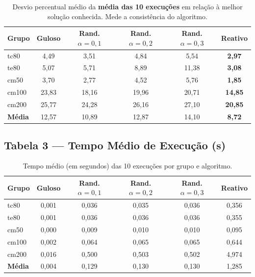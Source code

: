 \documentclass[12pt, a4paper]{article}
\begin{document}
{\small
\begin{table}[H]
\centering
\caption{Desvio percentual médio da \textbf{média das 10 execuções} em relação à melhor solução conhecida. Mede a consistência do algoritmo.}
\begin{tabular}{lccccc}
\toprule
\textbf{Grupo} & \textbf{Guloso} & \textbf{Rand. $\alpha{=}0{,}1$} & \textbf{Rand. $\alpha{=}0{,}2$} & \textbf{Rand. $\alpha{=}0{,}3$} & \textbf{Reativo} \\
\midrule
tc80  & 4,49 & 3,51 & 4,84 & 5,54 & \textbf{2,97} \\
te80  & 5,07 & 5,71 & 8,89 & 11,38 & \textbf{3,08} \\
cm50  & 3,70 & 2,77 & 4,52 & 5,76 & \textbf{1,85} \\
cm100 & 23,83 & 18,16 & 19,96 & 20,71 & \textbf{14,85} \\
cm200 & 25,77 & 24,28 & 26,16 & 27,10 & \textbf{20,85} \\
\midrule
\textbf{Média} & 12,57 & 10,89 & 12,87 & 14,10 & \textbf{8,72} \\
\bottomrule
\end{tabular}
\end{table}
}

\subsection{Tabela 3 --- Tempo Médio de Execução (s)}

{\small
\begin{table}[H]
\centering
\caption{Tempo médio (em segundos) das 10 execuções por grupo e algoritmo.}
\begin{tabular}{lccccc}
\toprule
\textbf{Grupo} & \textbf{Guloso} & \textbf{Rand. $\alpha{=}0{,}1$} & \textbf{Rand. $\alpha{=}0{,}2$} & \textbf{Rand. $\alpha{=}0{,}3$} & \textbf{Reativo} \\
\midrule
tc80  & 0,001 & 0,036 & 0,035 & 0,036 & 0,356 \\
te80  & 0,001 & 0,036 & 0,036 & 0,036 & 0,355 \\
cm50  & 0,000 & 0,009 & 0,010 & 0,010 & 0,095 \\
cm100 & 0,002 & 0,064 & 0,065 & 0,065 & 0,644 \\
cm200 & 0,016 & 0,500 & 0,503 & 0,502 & 4,974 \\
\midrule
\textbf{Média} & 0,004 & 0,129 & 0,130 & 0,130 & 1,285 \\
\bottomrule
\end{tabular}
\end{table}
}
\end{document}
